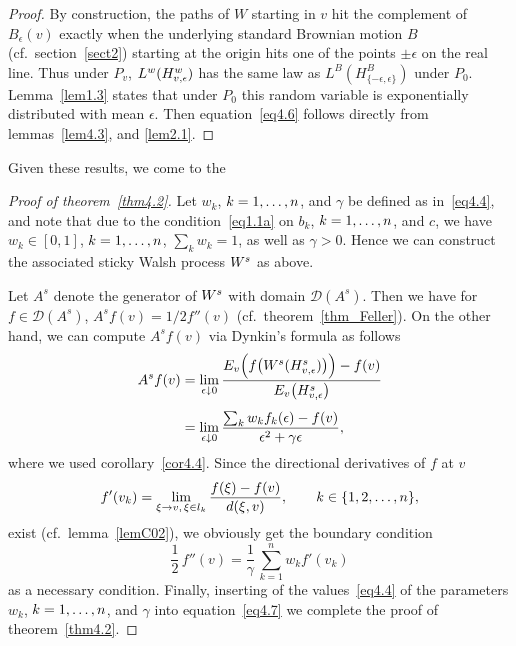 \documentclass[11pt,a4paper]{amsart}
\newcommand{\gep}{\epsilon}
\renewcommand{\gg}{\gamma}
\newcommand{\cD}{\mathcal{D}}
\newcommand{\1}{1}
\theoremstyle{remark}
\newcommand{\sn}{\ensuremath\{1,2,\dotsc,n\}}
\newcommand{\da}{\ensuremath\downarrow}
\newcommand{\kn}{\ensuremath k=1,\dotsc,n}
\newcommand{\TW}{\ensuremath H^w}
\newcommand{\Ws}{\ensuremath W^s}
\newcommand{\TsW}{\ensuremath H^s}
\numberwithin{equation}{section}
\begin{document}
\begin{proof}
By construction, the paths of $W$ starting in $v$ hit the complement of $B_\gep(v)$
exactly when the underlying standard Brownian motion $B$ (cf.\ section~\ref{sect2})
starting at the origin hits one of the points $\pm\gep$ on the real line. Thus under $P_v$,
$L^w(\TW_{v,\gep})$ has the same law as $L^B(H^B_{\{-\gep,\gep\}})$ under $P_0$.
Lemma~\ref{lem1.3} states that under $P_0$ this random variable
is exponentially distributed with mean $\gep$. Then equation~\eqref{eq4.6} follows
directly from lemmas~\ref{lem4.3}, and \ref{lem2.1}.
\end{proof}

Given these results, we  come to the

\begin{proof}[Proof of theorem~\ref{thm4.2}]
Let $w_k$, $\kn$, and $\gg$ be defined as in~\eqref{eq4.4}, and note that due to the
condition~\eqref{eq1.1a} on $b_k$, $\kn$, and $c$, we have $w_k\in [0,1]$, $\kn$,
$\sum_k w_k =1$, as well as $\gg>0$. Hence we can construct the associated sticky
Walsh process $\Ws$ as above.

Let $A^s$ denote the generator of $\Ws$ with domain $\cD(A^s)$. Then we
have for $f\in\cD(A^s)$, $A^s f(v) = 1/2 f''(v)$ (cf.\ theorem~\ref{thm_Feller}). On the
other hand, we can compute $A^s f(v)$ via Dynkin's formula as follows
\begin{align*}
    A^s f(v)
        &= \lim_{\gep\da 0} \frac{E_v\Bigl(f\bigl(\Ws(\TsW_{v,\gep})\bigr)\Bigr)-f(v)}
                                 {E_v\bigl(\TsW_{v,\gep}\bigr)}\\[1ex]
        &= \lim_{\gep\da 0} \frac{\sum_k w_k f_k(\gep) - f(v)}{\gep^2 + \gg\gep},
\end{align*}
where we used corollary~\ref{cor4.4}. Since the directional derivatives of $f$ at $v$
\begin{equation*}
    f'(v_k)=\lim_{\xi\to v,\,\xi\in l_k}    \frac{f(\xi)-f(v)}{d(\xi,v)},\qquad k\in\sn,
\end{equation*}
exist (cf.\ lemma~\ref{lemC02}), we obviously get the boundary condition
\begin{equation}    \label{eq4.7}
    \frac{1}{2}\,f''(v) = \frac{1}{\gg}\,\sum_{k=1}^n w_k f'(v_k)
\end{equation}
as a necessary condition. Finally, inserting of the values~\eqref{eq4.4} of the
parameters $w_k$, $\kn$, and $\gg$ into equation~\eqref{eq4.7} we complete the proof
of theorem~\ref{thm4.2}.
\end{proof}
\end{document}
